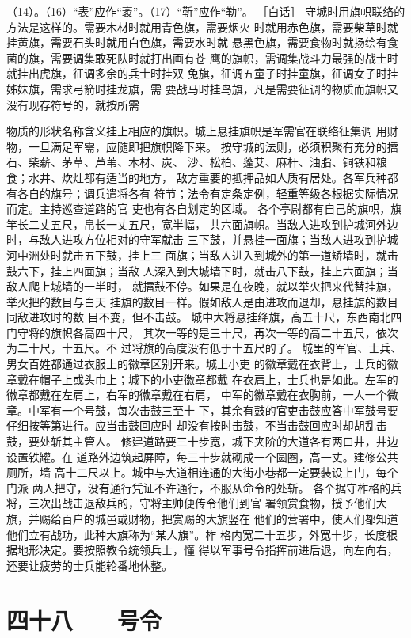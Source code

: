 \documentclass[12pt,UTF8]{ctexbook}
\begin{document}
（14）。（16）“表”应作“袤”。（17）“靳”应作“勒”。 
［白话］ 
守城时用旗帜联络的方法是这样的。需要木材时就用青色旗，需要烟火 
时就用赤色旗，需要柴草时就挂黄旗，需要石头时就用白色旗，需要水时就 
悬黑色旗，需要食物时就扬绘有食菌的旗，需要调集敢死队时就打出画有苍 
鹰的旗帜，需调集战斗力最强的战士时就挂出虎旗，征调多余的兵士时挂双 
兔旗，征调五童子时挂童旗，征调女子时挂姊妹旗，需求弓箭时挂龙旗，需 
要战马时挂鸟旗，凡是需要征调的物质而旗帜又没有现存符号的，就按所需 

物质的形状名称含义挂上相应的旗帜。城上悬挂旗帜是军需官在联络征集调 
用财物，一旦满足军需，应随即把旗帜降下来。 
按守城的法则，必须积聚有充分的擂石、柴薪、茅草、芦苇、木材、炭、 
沙、松柏、蓬艾、麻杆、油脂、铜铁和粮食；水井、炊灶都有适当的地方， 
敌方重要的抵押品如人质有居处。各军兵种都有各自的旗号；调兵遣将各有 
符节；法令有定条定例，轻重等级各根据实际情况而定。主持巡查道路的官 
吏也有各自划定的区域。 
各个亭尉都有自己的旗帜，旗竿长二丈五尺，帛长一丈五尺，宽半幅， 
共六面旗帜。当敌人进攻到护城河外边时，与敌人进攻方位相对的守军就击 
三下鼓，并悬挂一面旗；当敌人进攻到护城河中洲处时就击五下鼓，挂上三 
面旗；当敌人进入到城外的第一道矫墙时，就击鼓六下，挂上四面旗；当敌 
人深入到大城墙下时，就击八下鼓，挂上六面旗；当敌人爬上城墙的一半时， 
就擂鼓不停。如果是在夜晚，就以举火把来代替挂旗，举火把的数目与白天 
挂旗的数目一样。假如敌人是由进攻而退却，悬挂旗的数目同敌进攻时的数 
目不变，但不击鼓。 
城中大将悬挂绛旗，高五十尺，东西南北四门守将的旗帜各高四十尺， 
其次一等的是三十尺，再次一等的高二十五尺，依次为二十尺，十五尺。不 
过将旗的高度没有低于十五尺的了。 
城里的军官、士兵、男女百姓都通过衣服上的徽章区别开来。城上小吏 
的徽章戴在衣背上，士兵的徽章戴在帽子上或头巾上；城下的小吏徽章都戴 
在衣肩上，士兵也是如此。左军的徽章都戴在左肩上，右军的徽章戴在右肩， 
中军的徽章戴在衣胸前，一人一个微章。中军有一个号鼓，每次击鼓三至十 
下，其余有鼓的官吏击鼓应答中军鼓号要仔细按等第进行。应当击鼓回应时 
却没有按时击鼓，不当击鼓回应时却胡乱击鼓，要处斩其主管人。 
修建道路要三十步宽，城下夹阶的大道各有两口井，井边设置铁罐。在 
道路外边筑起屏障，每三十步就砌成一个圆圈，高一丈。建修公共厕所，墙 
高十二尺以上。城中与大道相连通的大街小巷都一定要装设上门，每个门派 
两人把守，没有通行凭证不许通行，不服从命令的处斩。 
各个据守柞格的兵将，三次出战击退敌兵的，守将主帅便传令他们到官 
署领赏食物，授予他们大旗，并赐给百户的城邑或财物，把赏赐的大旗竖在 
他们的营署中，使人们都知道他们立有战功，此种大旗称为“某人旗”。柞 
格内宽二十五步，外宽十步，长度根据地形决定。要按照教令统领兵士，懂 
得以军事号令指挥前进后退，向左向右，还要让疲劳的士兵能轮番地休整。 

\chapter{四十八　　号令}
\end{document}
